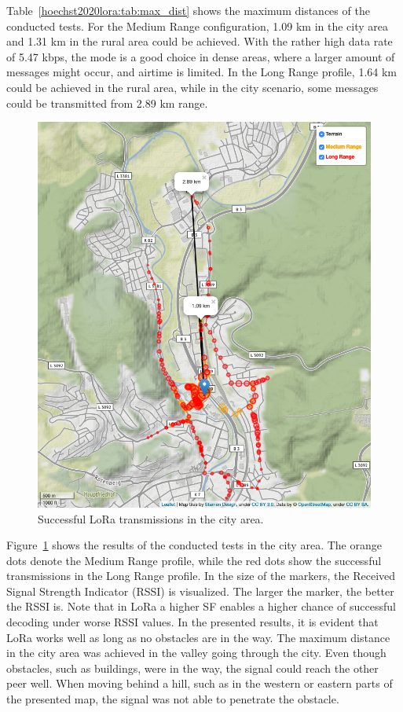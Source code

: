 Table~\ref{hoechst2020lora:tab:max_dist} shows the maximum distances of the conducted tests.
For the Medium Range configuration, 1.09 km in the city area and 1.31 km in the rural area could be achieved.
With the rather high data rate of 5.47 kbps, the mode is a good choice in dense areas, where a larger amount of messages might occur, and airtime is limited.
In the Long Range profile, 1.64 km could be achieved in the rural area, while in the city scenario, some messages could be transmitted from 2.89 km range.

\begin{figure}[ht!]
    \centering
    \includegraphics[width=\textwidth]{gfx/city.png}
    \caption{Successful LoRa transmissions in the city area.}
    \label{hoechst2020lora:fig:eval_city_new}
\end{figure}

Figure~\ref{hoechst2020lora:fig:eval_city_new} shows the results of the conducted tests in the city area.
The orange dots denote the Medium Range profile, while the red dots show the successful transmissions in the Long Range profile.
In the size of the markers, the Received Signal Strength Indicator (RSSI) is visualized. The larger the marker, the better the RSSI is. 
Note that in LoRa a higher SF enables a higher chance of successful decoding under worse RSSI values.
In the presented results, it is evident that LoRa works well as long as no obstacles are in the way. 
The maximum distance in the city area was achieved in the valley going through the city. 
Even though obstacles, such as buildings, were in the way, the signal could reach the other peer well.
When moving behind a hill, such as in the western or eastern parts of the presented map, the signal was not able to penetrate the obstacle.

